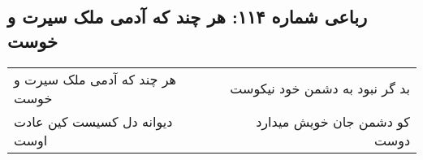 \begin{center}
\section*{رباعی شماره ۱۱۴: هر چند که آدمی ملک سیرت و خوست}
\label{sec:sh114}
\begin{longtable}{l p{0.5cm} r}
هر چند که آدمی ملک سیرت و خوست
&&
بد گر نبود به دشمن خود نیکوست
\\
دیوانه دل کسیست کین عادت اوست
&&
کو دشمن جان خویش میدارد دوست
\\
\end{longtable}
\end{center}
